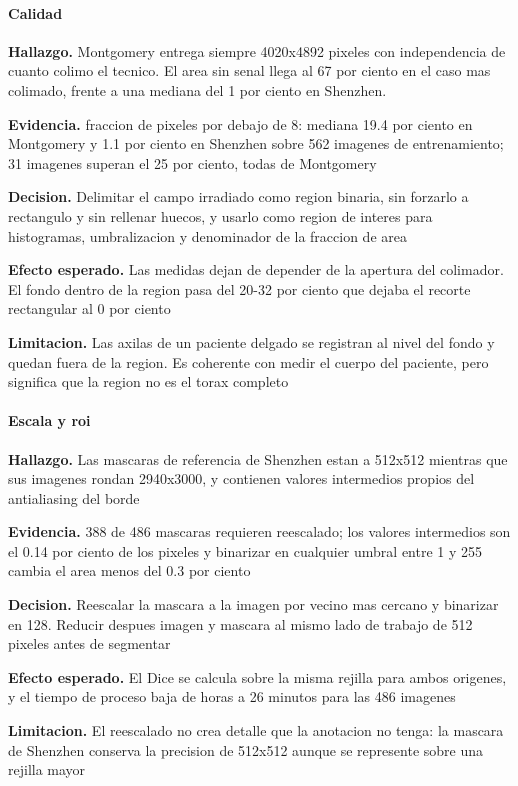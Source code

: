 \paragraph{Calidad}
\textbf{Hallazgo.} Montgomery entrega siempre 4020x4892 pixeles con independencia de cuanto colimo el tecnico. El area sin senal llega al 67 por ciento en el caso mas colimado, frente a una mediana del 1 por ciento en Shenzhen.

\textbf{Evidencia.} fraccion de pixeles por debajo de 8: mediana 19.4 por ciento en Montgomery y 1.1 por ciento en Shenzhen sobre 562 imagenes de entrenamiento; 31 imagenes superan el 25 por ciento, todas de Montgomery

\textbf{Decision.} Delimitar el campo irradiado como region binaria, sin forzarlo a rectangulo y sin rellenar huecos, y usarlo como region de interes para histogramas, umbralizacion y denominador de la fraccion de area

\textbf{Efecto esperado.} Las medidas dejan de depender de la apertura del colimador. El fondo dentro de la region pasa del 20-32 por ciento que dejaba el recorte rectangular al 0 por ciento

\textbf{Limitacion.} Las axilas de un paciente delgado se registran al nivel del fondo y quedan fuera de la region. Es coherente con medir el cuerpo del paciente, pero significa que la region no es el torax completo

\paragraph{Escala y roi}
\textbf{Hallazgo.} Las mascaras de referencia de Shenzhen estan a 512x512 mientras que sus imagenes rondan 2940x3000, y contienen valores intermedios propios del antialiasing del borde

\textbf{Evidencia.} 388 de 486 mascaras requieren reescalado; los valores intermedios son el 0.14 por ciento de los pixeles y binarizar en cualquier umbral entre 1 y 255 cambia el area menos del 0.3 por ciento

\textbf{Decision.} Reescalar la mascara a la imagen por vecino mas cercano y binarizar en 128. Reducir despues imagen y mascara al mismo lado de trabajo de 512 pixeles antes de segmentar

\textbf{Efecto esperado.} El Dice se calcula sobre la misma rejilla para ambos origenes, y el tiempo de proceso baja de horas a 26 minutos para las 486 imagenes

\textbf{Limitacion.} El reescalado no crea detalle que la anotacion no tenga: la mascara de Shenzhen conserva la precision de 512x512 aunque se represente sobre una rejilla mayor

